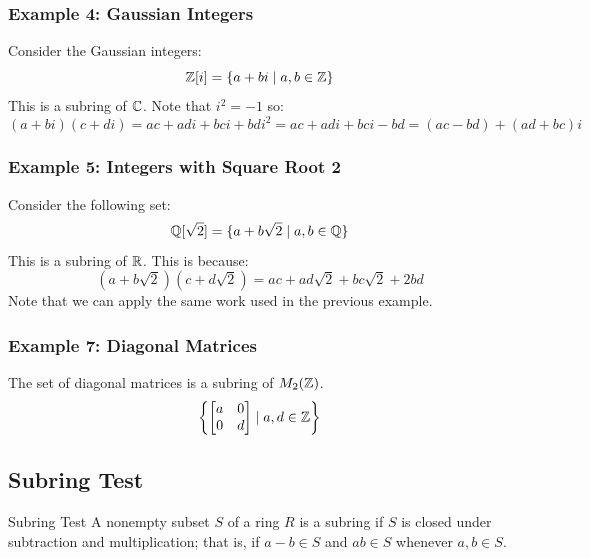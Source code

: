 \documentclass[letterpaper]{article}
\begin{document}
\subsubsection{Example 4: Gaussian Integers}
Consider the Gaussian integers:
\[\mathbb{Z}[i] = \{a + bi \mid a, b \in \mathbb{Z}\}\]
This is a subring of $\mathbb{C}$. Note that $i^2 = -1$ so:
\[(a + bi)(c + di) = ac + adi + bci + bdi^2 = ac + adi + bci - bd = (ac - bd) + (ad + bc)i\]

\subsubsection{Example 5: Integers with Square Root 2}
Consider the following set: 
\[\mathbb{Q}[\sqrt{2}] = \{a + b\sqrt{2} \mid a, b \in \mathbb{Q}\}\]
This is a subring of $\mathbb{R}$. This is because: 
\[(a + b\sqrt{2})(c + d\sqrt{2}) = ac + ad\sqrt{2} + bc\sqrt{2} + 2bd\]
Note that we can apply the same work used in the previous example. 

\subsubsection{Example 7: Diagonal Matrices}
The set of diagonal matrices is a subring of $M_{2}(\mathbb{Z})$. 
\[\left\{\begin{bmatrix}
    a & 0 \\ 0 & d
\end{bmatrix} \mid a, d \in \mathbb{Z}\right\}\]


\subsection{Subring Test}
\begin{theorem}{Subring Test}{}
    A nonempty subset $S$ of a ring $R$ is a subring if $S$ is closed under subtraction and multiplication; that is, if $a - b \in S$ and $ab \in S$ whenever $a, b \in S$. 
\end{theorem}
\end{document}
